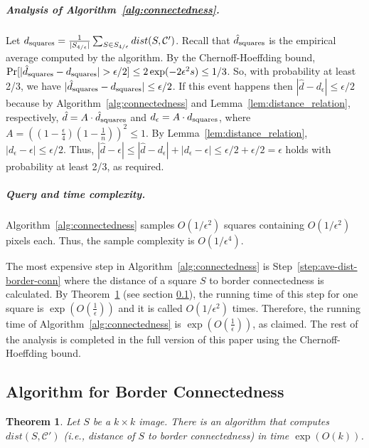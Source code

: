 \documentclass[11pt,english]{article}
\newtheorem{theorem}{Theorem}[section]
\numberwithin{figure}{section}
\newcommand{\C}{{\mathcal C}}
\newcommand{\eps}{{\epsilon}}
\newcommand{\dis}{dist}
\newcommand{\mydelta}{\epsilon} \newcommand{\bigdelta}{{\epsilon_0}} \newcommand{\dsquares}{d_{\rm squares}}
\newcommand{\dhatsquares}{\hat{d}_{\rm squares}}
\newcommand{\dout}{\hat{d}}
\begin{document}
\ifnum{}

\subparagraph{Analysis of Algorithm~\ref{alg:connectedness}.}
Let $\dsquares =\frac 1 {|S_{4/\mydelta}|}\sum_{S\in S_{4/\mydelta}}\dis(S,\C')$. Recall that $\dhatsquares$ is the empirical average computed by the algorithm.
By the Chernoff-Hoeffding bound, $\Pr[|\dhatsquares-\dsquares|>\mydelta/2]\leq 2\exp(-2\mydelta^{2}s)\leq 1/3$. So, with probability at least 2/3, we have $|\dhatsquares-\dsquares|\leq \mydelta/2$. If this event happens then
$|\dout-d_\mydelta|\leq \mydelta/2$ because by Algorithm~\ref{alg:connectedness} and Lemma~\ref{lem:distance_relation}, respectively, $\dout=A\cdot\dhatsquares$ and $d_\mydelta= A\cdot\dsquares$, where $A=\left((1-\frac \mydelta 4) (1-\frac 1n)\right)^2 \leq 1$. By Lemma~\ref{lem:distance_relation}, $|d_\mydelta-\eps|\leq \mydelta/2$. Thus,
$|\dout-\eps|
\leq |\dout-d_\mydelta|+ |d_\mydelta-\eps|
\leq \mydelta/2+\mydelta/2=\mydelta$ holds with probability at least 2/3, as required.

\subparagraph{Query and time complexity.}
Algorithm~\ref{alg:connectedness} samples $O(1/\mydelta^2)$ squares containing $O(1/\mydelta^2)$ pixels each. Thus, the sample complexity is $O(1/\mydelta^4)$.

The most expensive step in Algorithm~\ref{alg:connectedness} is Step~\ref{step:ave-dist-border-conn} where the distance of a square $S$ to border connectedness is calculated. By Theorem~\ref{thm:border-con} (see section \ref{sec:border-con}), the running time of this step for one square is $\exp\left(O\left(\frac 1 \mydelta \right)\right)$ and it is called $O(1/\eps^2)$ times. Therefore, the running time of Algorithm~\ref{alg:connectedness} is $\exp\left(O\left(\frac 1 \mydelta \right)\right)$, as claimed.
\else
The rest of the analysis is completed in the {\color{black} full version of this paper} using the Chernoff-Hoeffding bound.
\fi

\subsection{Algorithm for Border Connectedness}
\label{sec:border-con}

\begin{theorem}
\label{thm:border-con}
Let $S$ be a $k\times k$ image. There is an algorithm that computes $\dis(S,\C')$ (i.e., distance of $S$ to border connectedness) in time $\exp \left (O(k)\right)$.
\end{theorem}
\end{document}
